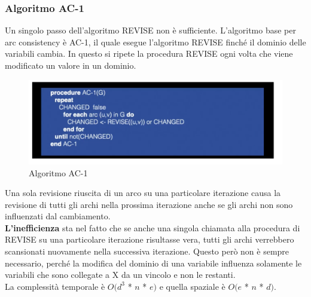 \subsubsection{Algoritmo AC-1}
Un singolo passo dell'algoritmo REVISE non è sufficiente. L'algoritmo base per arc consistency è AC-1, il quale esegue l'algoritmo REVISE finché il dominio delle variabili cambia. In questo si ripete la procedura REVISE ogni volta che viene modificato un valore in un dominio.
\begin{figure}[H]
    \centering
    \includegraphics[width=13cm, keepaspectratio]{img/Cap3/ac-1.png}
    \caption{Algoritmo AC-1}
\end{figure}

Una sola revisione riuscita di un arco su una particolare iterazione causa la revisione di tutti gli archi nella prossima iterazione anche se gli archi non sono influenzati dal cambiamento.\\
\textbf{L'inefficienza} sta nel fatto che se anche una singola chiamata alla procedura di REVISE su una particolare iterazione risultasse vera, tutti gli archi verrebbero scansionati nuovamente nella successiva iterazione. Questo però non è sempre necessario, perché la modifica del dominio di una variabile influenza solamente le variabili che sono collegate a X da un vincolo e non le restanti.\\
La complessità temporale è $O(d^3$ * $n$ * $e)$ e quella spaziale è $O(e$ * $n$ * $d)$.

